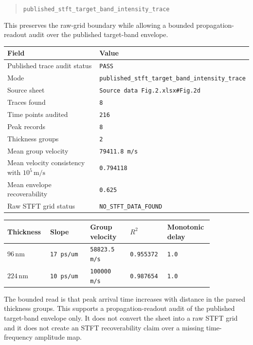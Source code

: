 \documentclass[11pt]{article}
\begin{document}
\begin{quote}
\texttt{published\_stft\_target\_band\_intensity\_trace}
\end{quote}

This preserves the raw-grid boundary while allowing a bounded propagation-readout
audit over the published target-band envelope.

\begin{center}
\begin{tabular}{ll}
\toprule
Field & Value \\
\midrule
Published trace audit status & \texttt{PASS} \\
Mode & \texttt{published\_stft\_target\_band\_intensity\_trace} \\
Source sheet & \texttt{Source data Fig.2.xlsx\#Fig.2d} \\
Traces found & \texttt{8} \\
Time points audited & \texttt{216} \\
Peak records & \texttt{8} \\
Thickness groups & \texttt{2} \\
Mean group velocity & \texttt{79411.8 m/s} \\
Mean velocity consistency with \(10^5\,\mathrm{m/s}\) & \texttt{0.794118} \\
Mean envelope recoverability & \texttt{0.625} \\
Raw STFT grid status & \texttt{NO\_STFT\_DATA\_FOUND} \\
\bottomrule
\end{tabular}
\end{center}

\begin{longtable}{p{0.16\linewidth}p{0.18\linewidth}p{0.18\linewidth}p{0.16\linewidth}p{0.16\linewidth}}
\toprule
Thickness & Slope & Group velocity & \(R^2\) & Monotonic delay \\
\midrule
\endhead
\(96\,\mathrm{nm}\) & \texttt{17 ps/um} & \texttt{58823.5 m/s} & \texttt{0.955372} & \texttt{1.0} \\
\(224\,\mathrm{nm}\) & \texttt{10 ps/um} & \texttt{100000 m/s} & \texttt{0.987654} & \texttt{1.0} \\
\bottomrule
\end{longtable}

The bounded read is that peak arrival time increases with distance in the
parsed thickness groups. This supports a propagation-readout audit of the
published target-band envelope only. It does not convert the sheet into a raw
STFT grid and it does not create an STFT recoverability claim over a missing
time-frequency amplitude map.
\end{document}
